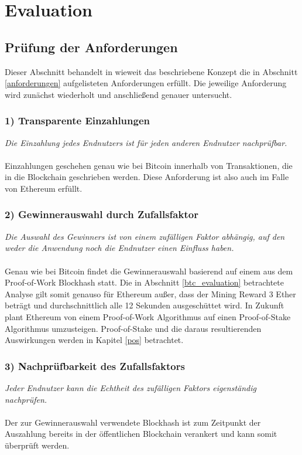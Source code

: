 \section{Evaluation}
\subsection{Prüfung der Anforderungen}

Dieser Abschnitt behandelt in wieweit das beschriebene Konzept die in Abschnitt \ref{anforderungen} aufgelisteten Anforderungen erfüllt. Die jeweilige Anforderung wird zunächst wiederholt und anschließend genauer untersucht.

\subsubsection{1) Transparente Einzahlungen}
\textit{Die Einzahlung jedes Endnutzers ist für jeden anderen Endnutzer nachprüfbar.}\\\\
Einzahlungen geschehen genau wie bei Bitcoin innerhalb von Transaktionen, die in die Blockchain geschrieben werden. Diese Anforderung ist also auch im Falle von Ethereum erfüllt.
\subsubsection{2) Gewinnerauswahl durch Zufallsfaktor}
\textit{Die Auswahl des Gewinners ist von einem zufälligen Faktor abhängig, auf den weder die Anwendung noch die Endnutzer einen Einfluss haben.}\\\\
Genau wie bei Bitcoin findet die Gewinnerauswahl basierend auf einem aus dem Proof-of-Work Blockhash statt. Die in Abschnitt \ref{btc_evaluation} betrachtete Analyse gilt somit genauso für Ethereum außer, dass der Mining Reward 3 Ether beträgt und durchschnittlich alle 12 Sekunden ausgeschüttet wird. In Zukunft plant Ethereum von einem Proof-of-Work Algorithmus auf einen Proof-of-Stake Algorithmus umzusteigen. Proof-of-Stake und die daraus resultierenden Auswirkungen werden in Kapitel \ref{pos} betrachtet.
\subsubsection{3) Nachprüfbarkeit des Zufallsfaktors}
\textit{Jeder Endnutzer kann die Echtheit des zufälligen Faktors eigenständig nachprüfen.}\\\\
Der zur Gewinnerauswahl verwendete Blockhash ist zum Zeitpunkt der Auszahlung bereits in der öffentlichen Blockchain verankert und kann somit überprüft werden.

